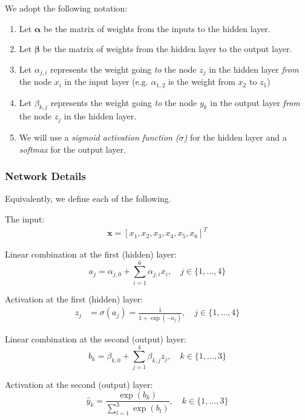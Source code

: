 \documentclass{article}
\newcommand{\xv}{\mathbf{x}}
\theoremstyle{definition}
\theoremstyle{remark}
\newenvironment{Q_nosol}
{%
\clearpage
\item
}
{%
\phantom{s} %
\bigskip
}
\begin{document}
\begin{enumerate}[font={\Large\bfseries},left=0pt]
\begin{Q_nosol}
We adopt the following notation:
\begin{enumerate}
    \item Let {$\boldsymbol{\alpha}$} be the matrix of weights from the inputs to the hidden layer.
    \item Let {$\boldsymbol{\beta}$} be the matrix of weights from the hidden layer to the output layer.
    \item Let {${\alpha_{j,i}}$} represents the weight going \textit{to} the node $z_j$ in the hidden layer \textit{from} the node $x_i$ in the input layer (e.g. $\alpha_{1,2}$ is the weight from $x_2$ to $z_1$)
    \item Let {${\beta}_{k,j}$} represents the weight going \textit{to} the node $y_k$ in the output layer \textit{from} the node $z_j$ in the hidden layer.
    \item We will use a \emph{sigmoid activation function ({$\sigma$})} for the hidden layer and a \emph{softmax} for the output layer. 
\end{enumerate}

\subsubsection*{\textbf{Network Details}}
Equivalently, we define each of the following. 

The input:
\begin{align}
\xv=[x_1,x_2,x_3,x_4,x_5,x_6]^T
\end{align}

Linear combination at the first (hidden) layer:
\begin{equation}
a_j= \alpha_{j, 0} + \sum_{i=1}^6 \alpha_{j,i}x_i,\quad j \in \{1,\ldots,4\}
\end{equation}

Activation at the first (hidden) layer:
\begin{align}
z_j &= \sigma(a_j) = \frac{1}{1+\exp(-a_j)},\quad  j \in \{1,\ldots,4\}
\end{align}

Linear combination at the second (output) layer:
\begin{equation}
b_k = \beta_{k, 0} + \sum_{j=1}^4 \beta_{k,j}z_j,\quad  k \in \{1,\ldots,3\}
\end{equation}

Activation at the second (output) layer:
\begin{equation}
\hat{y}_k = \frac{\exp(b_k)}{\sum\limits_{l=1}^3 \exp(b_l)},\quad  k \in \{1,\ldots,3\}
\end{equation}


\end{Q_nosol}
\end{enumerate}
\end{document}

